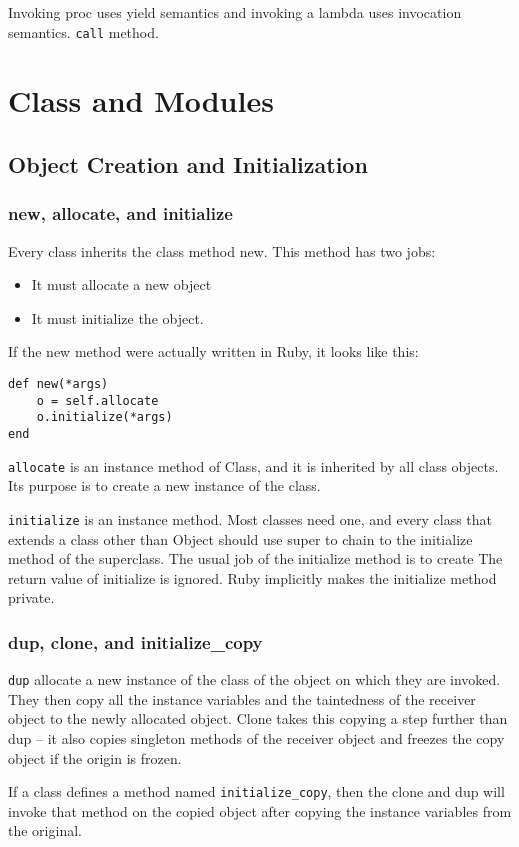 \documentclass[11pt, a4paper]{book}
\begin{document}
Invoking proc uses yield semantics and invoking a lambda uses invocation
semantics. \verb|call| method.

\chapter{Class and Modules}
\section{Object Creation and Initialization}
\subsection{new, allocate, and initialize}
Every class inherits the class method new. This method has two jobs:
\begin{itemize}
\item It must allocate a new object
\item It must initialize the object.
\end{itemize}

If the new method were actually written in Ruby, it looks like this:
\begin{verbatim}
def new(*args)
    o = self.allocate
    o.initialize(*args)
end
\end{verbatim}

\verb|allocate| is an instance method of Class, and it is inherited by all class
objects. Its purpose is to create a new instance of the class.

\verb|initialize| is an instance method. Most classes need one, and every class
that extends a class other than Object should use super to chain to the
initialize method of the superclass. The usual job of the initialize method is
to create The return value of initialize is ignored. Ruby implicitly makes the
initialize method private.

\subsection{dup, clone, and initialize\_copy}
\verb|dup| allocate a new instance of the class of the object on which they are
invoked. They then copy all the instance variables and the taintedness of the
receiver object to the newly allocated object. Clone takes this copying a step
further than dup -- it also copies singleton methods of the receiver object and
freezes the copy object if the origin is frozen.

If a class defines a method named \verb|initialize_copy|, then the clone and dup
will invoke that method on the copied object after copying the instance
variables from the original.
\end{document}
